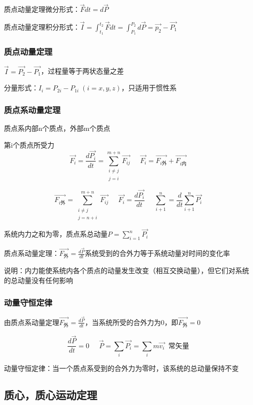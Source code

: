 \documentclass[UTF8]{article}
\begin{document}
    质点动量定理微分形式：$\vec{F}dt = d\vec{P}$

    质点动量定理积分形式：$\vec{I} = \int_{t_1}^{t_2}\vec{F}dt = \int_{P_1}^{P_2}d\vec{P} = \vec{p_2} - \vec{P_1}$

\subsubsection{质点动量定理}

    $\vec{I} = \vec{P_2} - \vec{P_1}$，过程量等于两状态量之差

    分量形式：$I_i = P_{2i} - P_{1i}\;(i = x, y, z)$，只适用于惯性系

\subsubsection{质点系动量定理}

    质点系内部n个质点，外部m个质点

    第i个质点所受力
    \[\vec{F_i} = \frac{d\vec{P_i}}{dt} = \sum_{\substack{i\neq j\\j=i}}^{m+n}\vec{F_{ij}}\;\;\;\;\;\vec{F_i} = \vec{F_{i\mbox{外}}}+\vec{F_{i\mbox{内}}}\]

    \[\vec{F_{i\mbox{外}}} = \sum_{\substack{i\neq j\\j=n+i}}^{m+n}\vec{F_{ij}}\;\;\;\;\;\vec{F_i} = \frac{d\vec{P_i}}{dt}\;\;\;\;\;\sum_{i+1}^n = \frac{d}{dt}\sum_{i+1}^n\vec{P_i}\]
    
    系统内力之和为零，质点系总动量\;\;$P = \sum_{i=1}^n\vec{P_i}$

    质点系动量定理：$\vec{F_{\mbox{外}}} = \frac{d\vec{P}}{dt}$\;\;\;系统受到的合外力等于系统动量对时间的变化率

    说明：内力能使系统内各个质点的动量发生改变（相互交换动量），但它们对系统的总动量没有任何影响

\subsubsection{动量守恒定律}

    由质点系动量定理\;\;\;$\vec{F_{\mbox{外}}} = \frac{d\vec{P}}{dt}$，当系统所受的合外力为0，即$\vec{F_{\mbox{外}}} = 0$

    \[\frac{d\vec{P}}{dt} = 0\;\;\;\;\;\vec{P} = \sum_i\vec{P_i} = \sum_im\vec{v_i}\;\;\mbox{常矢量}\]

    动量守恒定律：当一个质点系受到的合外力为零时，该系统的总动量保持不变

\subsection{质心，质心运动定理}
\end{document}
